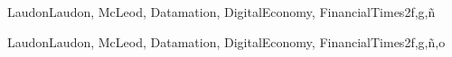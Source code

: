 \begin{syllabus}
\begin{unit}{\SPSecurityPoliciesLawsandComputerCrimes}{}{LaudonLaudon, McLeod, Datamation, DigitalEconomy, FinancialTimes}{2}{f,g,ñ}
	\begin{learningoutcomes}%
        \item \SPSecurityPoliciesLawsandComputerCrimesLOListClassic [\Familiarity]
        \item \SPSecurityPoliciesLawsandComputerCrimesLOIdentifyLaws [\Familiarity]
        \item \SPSecurityPoliciesLawsandComputerCrimesLODescribeTheRamifications [\Familiarity]
        \item \SPSecurityPoliciesLawsandComputerCrimesLOExamineTheLegal [\Familiarity]
        \item \SPSecurityPoliciesLawsandComputerCrimesLODiscussTheRole [\Familiarity]
        \item \SPSecurityPoliciesLawsandComputerCrimesLOInvestigateMeasures [\Familiarity]
        \item \SPSecurityPoliciesLawsandComputerCrimesLOWriteASecurity [\Familiarity]
	\end{learningoutcomes}
\end{unit}

\begin{unit}{\SPEconomiesofComputing}{}{LaudonLaudon, McLeod, Datamation, DigitalEconomy, FinancialTimes}{2}{f,g,ñ,o}
	\begin{topics}
        \item \SPEconomiesofComputingTopicMonopolies
        \item \SPEconomiesofComputingTopicEffect
        \item \SPEconomiesofComputingTopicPricing
        \item \SPEconomiesofComputingTopicThePhenomenon
        \item \SPEconomiesofComputingTopicConsequences
        \item \SPEconomiesofComputingTopicDifferences
        \item \SPEconomiesofComputingTopicCost
        \item \SPEconomiesofComputingTopicCostEstimates
        \item \SPEconomiesofComputingTopicEntrepreneurship
        \item \SPEconomiesofComputingTopicNetwork
        \item \SPEconomiesofComputingTopicUse
	\end{topics}


\end{unit}
\end{syllabus}
